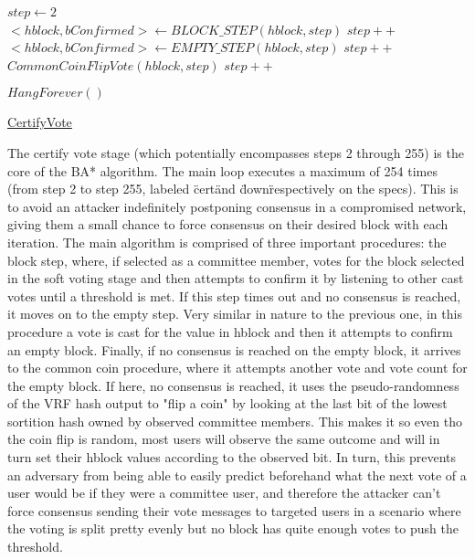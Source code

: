 \documentclass[10pt,a4paper]{article}
\begin{document}
\begin{algorithm}
    \begin{algorithmic}[1]

    \State $step \gets 2$
    {
        \\
        \State $<hblock, bConfirmed> \gets BLOCK\_STEP(hblock, step)$
        \EndIf
        \State $step++$\\
   
        \State $<hblock, bConfirmed> \gets EMPTY\_STEP(hblock,step)$
        \EndIf
        \State $step++$\\

        \State $CommonCoinFlipVote(hblock, step)$
        \State $step++$
    }
    \EndWhile

    \State $HangForever()$
    
    \EndFunction
    \end{algorithmic}
    \caption{\underline{CertifyVote}}
\end{algorithm}

The certify vote stage (which potentially encompasses steps 2 through 255) is the core of the BA* algorithm.
The main loop executes a maximum of 254 times (from step 2 to step 255, labeled \"cert\" and \"down\" respectively on the specs).
This is to avoid an attacker indefinitely postponing consensus in a compromised network, giving them a small chance to force consensus on their desired block with each iteration.
The main algorithm is comprised of three important procedures: the block step, where, if selected as a committee member, votes for the block selected in the soft voting stage and then attempts to confirm it by listening to other cast votes until a threshold is met.
If this step times out and no consensus is reached, it moves on to the empty step. Very similar in nature to the previous one, in this procedure a vote is cast for the value in hblock and then it attempts to confirm an empty block.
Finally, if no consensus is reached on the empty block, it arrives to the common coin procedure, where it attempts another vote and vote count for the empty block. If here, no consensus is reached, it uses the pseudo-randomness of the VRF hash output to "flip a coin" by looking at the last bit of the lowest sortition hash owned by observed committee members.
This makes it so even tho the coin flip is random, most users will observe the same outcome and will in turn set their hblock values according to the observed bit. In turn, this prevents an adversary from being able to easily predict beforehand what the next vote of a user would be if they were a committee user, and therefore the attacker can't force consensus 
sending their vote messages to targeted users in a scenario where the voting is split pretty evenly but no block has quite enough votes to push the threshold.
\end{document}
